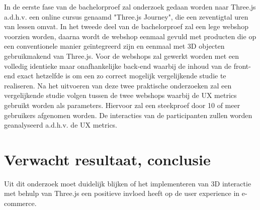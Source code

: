 In de eerste fase van de bachelorproef zal onderzoek gedaan worden naar Three.js a.d.h.v. een online cursus genaamd "Three.js Journey", die een zeventigtal uren van lessen omvat. In het tweede deel van de bachelorproef zal een lege webshop voorzien worden, daarna wordt de webshop eenmaal gevuld met producten die op een conventionele manier geïntegreerd zijn en eenmaal met 3D objecten gebruikmakend van Three.js. Voor de webshops zal gewerkt worden met een volledig identieke maar onafhankelijke back-end waarbij de inhoud van de front-end exact hetzelfde is om een zo correct mogelijk vergelijkende studie te realiseren.
 Na het uitvoeren van deze twee praktische onderzoeken zal een vergelijkende studie volgen tussen de twee webshops waarbij de UX metrics gebruikt worden als parameters. Hiervoor zal een steekproef door 10 of meer gebruikers afgenomen worden. De interacties van de participanten zullen worden geanalyseerd a.d.h.v. de UX metrics.

\section{Verwacht resultaat, conclusie}%
\label{sec:verwachte_resultaten}

Uit dit onderzoek moet duidelijk blijken of het implementeren van 3D interactie met behulp van Three.js een positieve invloed heeft op de user experience in e-commerce. 

